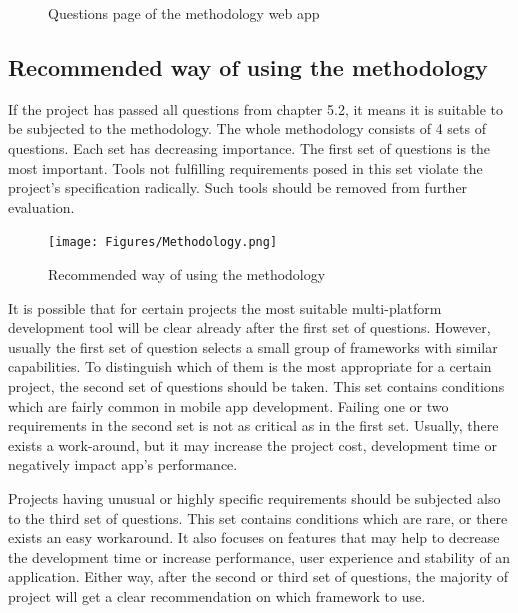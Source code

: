 \documentclass[english,master,public,dept460,male,cpdeclaration,oneside]{diploma}
\begin{document}
\begin{figure}
	\centering{}
	\caption{Questions page of the methodology web app}
	\label{figure:webQuestions}
\end{figure}

\subsection{Recommended way of using the methodology}
If the project has passed all questions from chapter 5.2, it means it is suitable to be subjected to the methodology. The whole methodology consists of 4 sets of questions. Each set has decreasing importance. The first set of questions is the most important. Tools not fulfilling requirements posed in this set violate the project's specification radically. Such tools should be removed from further evaluation.

\begin{figure}
	\centering\texttt{[image: Figures/Methodology.png]}
	\caption{Recommended way of using the methodology}
	\label{figure:activityMethodology}
\end{figure}
	
It is possible that for certain projects the most suitable multi-platform development tool will be clear already after the first set of questions. However, usually the first set of question selects a small group of frameworks with similar capabilities. To distinguish which of them is the most appropriate for a certain project, the second set of questions should be taken. This set contains conditions which are fairly common in mobile app development. Failing one or two requirements in the second set is not as critical as in the first set. Usually, there exists a work-around, but it may increase the project cost, development time or negatively impact app's performance.
	
Projects having unusual or highly specific requirements should be subjected also to the third set of questions. This set contains conditions which are rare, or there exists an easy workaround. It also focuses on features that may help to decrease the development time or increase performance, user experience and stability of an application. Either way, after the second or third set of questions, the majority of project will get a clear recommendation on which framework to use.
	
\end{document}
